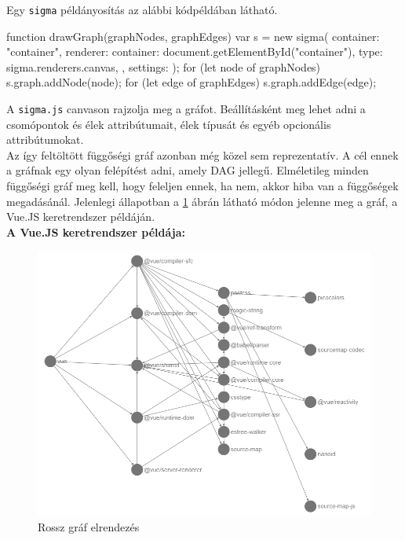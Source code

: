 Egy \texttt{sigma} példányosítás az alábbi kódpéldában látható.
\begin{js}
function drawGraph(graphNodes, graphEdges){	
  var s = new sigma({ 
    container: "container",
    renderer: {
      container: document.getElementById("container"),
      type: sigma.renderers.canvas,
    },
    settings: {}
  });
  for (let node of graphNodes) {
    s.graph.addNode(node);
  }
  for (let edge of graphEdges) {
    s.graph.addEdge(edge);
  }
}
\end{js}

A \texttt{sigma.js} canvason rajzolja meg a gráfot. Beállításként meg lehet adni a csomópontok és élek attribútumait, élek típusát és egyéb opcionális attribútumokat.\\

Az így feltöltött függőségi gráf azonban még közel sem reprezentatív. A cél ennek a gráfnak egy olyan felépítést adni, amely DAG jellegű. Elméletileg minden függőségi gráf meg kell, hogy feleljen ennek, ha nem, akkor hiba van a függőségek megadásánál. Jelenlegi állapotban a \ref{fig:graph_wrong} ábrán látható módon jelenne meg a gráf, a Vue.JS keretrendszer példáján.\\

\textbf{A Vue.JS keretrendszer példája:}

\begin{figure}[!h]
	\centering
	\includegraphics[scale=0.35]{images/graph_wrong.png}
	\caption{Rossz gráf elrendezés}
	\label{fig:graph_wrong}
\end{figure}

